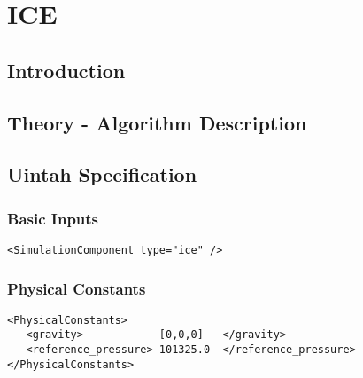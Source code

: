 
\section{ICE} \label{Sec:ICE}


\subsection{Introduction}

\subsection{Theory - Algorithm Description}

\subsection{Uintah Specification}
\subsubsection{Basic Inputs}
\footnotesize
\begin{Verbatim}[fontsize=\footnotesize]
 <SimulationComponent type="ice" />
\end{Verbatim}
\normalsize
\subsubsection{Physical Constants}
\footnotesize
\begin{Verbatim}[fontsize=\footnotesize]
<PhysicalConstants>
   <gravity>            [0,0,0]   </gravity>
   <reference_pressure> 101325.0  </reference_pressure>
</PhysicalConstants>
\end{Verbatim}
\normalsize
